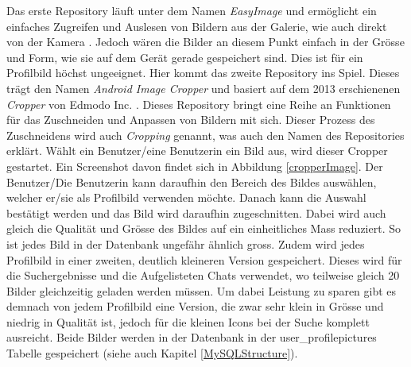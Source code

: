 \documentclass[../main.tex]{subfiles}
\begin{document}
	Das erste Repository läuft unter dem Namen \emph{EasyImage} und ermöglicht ein einfaches Zugreifen und Auslesen von Bildern aus der Galerie, wie auch direkt von der Kamera \cite{EasyImage}. Jedoch wären die Bilder an diesem Punkt einfach in der Grösse und Form, wie sie auf dem Gerät gerade gespeichert sind. Dies ist für ein Profilbild höchst ungeeignet. Hier kommt das zweite Repository ins Spiel. Dieses trägt den Namen \emph{Android Image Cropper} und basiert auf dem 2013 erschienenen \emph{Cropper} von Edmodo Inc. \cite{Cropper} \cite{edmodo}. Dieses Repository bringt eine Reihe an Funktionen für das Zuschneiden und Anpassen von Bildern mit sich. Dieser Prozess des Zuschneidens wird auch \emph{Cropping} genannt, was auch den Namen des Repositories erklärt. Wählt ein Benutzer/eine Benutzerin ein Bild aus, wird dieser Cropper gestartet. Ein Screenshot davon findet sich in Abbildung \ref{cropperImage}. Der Benutzer/Die Benutzerin kann daraufhin den Bereich des Bildes auswählen, welcher er/sie als Profilbild verwenden möchte. Danach kann die Auswahl bestätigt werden und das Bild wird daraufhin zugeschnitten. Dabei wird auch gleich die Qualität und Grösse des Bildes auf ein einheitliches Mass reduziert. So ist jedes Bild in der Datenbank ungefähr ähnlich gross. Zudem wird jedes Profilbild in einer zweiten, deutlich kleineren Version gespeichert. Dieses wird für die Suchergebnisse und die Aufgelisteten Chats verwendet, wo teilweise gleich 20 Bilder gleichzeitig geladen werden müssen. Um dabei Leistung zu sparen gibt es demnach von jedem Profilbild eine Version, die zwar sehr klein in Grösse und niedrig in Qualität ist, jedoch für die kleinen Icons bei der Suche komplett ausreicht. Beide Bilder werden in der Datenbank in der user\_profilepictures Tabelle gespeichert (siehe auch Kapitel \ref{MySQLStructure}).
	
\end{document}
